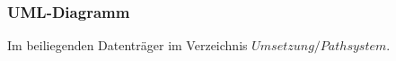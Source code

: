 \documentclass[
	12pt,
	a4paper,
	bibtotoc,
	cleardoubleempty, 
	idxtotoc,
	ngerman,
	openright
	final,
	listof=nochaptergap,
	]{scrbook}
\begin{document}
\begin{appendices}
\subsubsection{UML-Diagramm}\label{sec:append_realisation_uml_path}
Im beiliegenden Datenträger im Verzeichnis $Umsetzung/Pathsystem$. 




% 
% 
\end{appendices}
\end{document}
